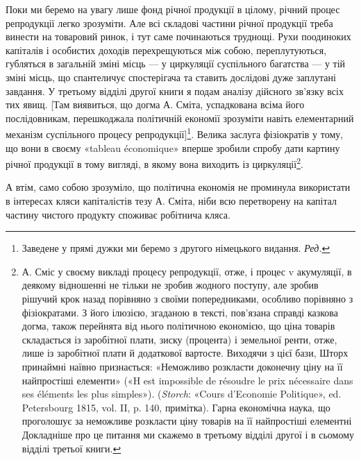 Поки ми беремо на увагу лише фонд річної продукції в цілому,
річний процес репродукції легко зрозуміти. Але всі складові
частини річної продукції треба винести на товаровий ринок, і
тут саме починаються труднощі. Рухи поодиноких капіталів і
особистих доходів перехрещуються між собою, переплутуються,
губляться в загальній зміні місць — у циркуляції суспільного
багатства — у тій зміні місць, що спантеличує спостерігача та
ставить дослідові дуже заплутані завдання. У третьому відділі
другої книги я подам аналізу дійсного зв’язку всіх тих явищ.
[Там виявиться, що догма А. Сміта, успадкована всіма його послідовникам,
перешкоджала політичній економії зрозуміти навіть
елементарний механізм суспільного процесу репродукції]\footnote*{
Заведене у прямі дужки ми беремо з другого німецького видання.
\emph{Ред.}
}. Велика
заслуга фізіократів у тому, що вони в своєму «tableau économique»
вперше зробили спробу дати картину річної продукції
в тому вигляді, в якому вона виходить із циркуляції\footnote{
А. Сміс у своєму викладі процесу репродукції, отже, і процес v
акумуляції, в деякому відношенні не тільки не зробив жодного поступу,
але зробив рішучий крок назад порівняно з своїми попередниками, особливо
порівняно з фізіократами. З його ілюзією, згаданою в тексті, пов’язана
справді казкова догма, також перейнята від нього політичною економією,
що ціна товарів складається із заробітної плати, зиску (процента)
і земельної ренти, отже, лише із заробітної плати й додаткової вартосте.
Виходячи з цієї бази, Шторх принаймні наївно признається: «Неможливо
розкласти доконечну ціну на її найпростіші елементи» («H est
impossible de résoudre le prix nécessaire dans ses éléments les plus simples»).
(\emph{Storch}: «Cours d’Economie Politique», ed. Petersbourg 1815,
vol. II, p. 140, примітка). Гарна економічна наука, що проголошує за
неможливе розкласти ціну товарів на її найпростіші елементні Докладніше
про це питання ми скажемо в третьому відділі другої і в сьомому
відділі третьої книги.
}.

А втім, само собою зрозуміло, що політична економія не проминула
використати в інтересах кляси капіталістів тезу А. Сміта,
ніби всю перетворену на капітал частину чистого продукту споживає
робітнича кляса.
